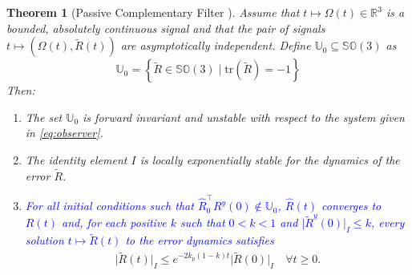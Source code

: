 \documentclass{article}
\newcommand{\SOthree}{\mathbb{SO}(3)}
\newcommand{\R}[1]{\mathbb{R}^{#1}}
\newtheorem{theorem}{Theorem}
\newcommand{\textblue}[1]{\textcolor{blue}{#1}}
\newcommand{\Rtilde}{\tilde{R}}
\newcommand{\normSOthree}[1]{{{\vert}#1 {\vert}_I}}
\newcommand{\expo}[1]{e^{#1}}
\begin{document}
\begin{theorem}[Passive Complementary Filter \textblue{{\cite[Theorem 4.2]{mahony_complementaryFilter}}}]
Assume that $t\mapsto \Omega(t)\in \R{3}$ is a bounded, absolutely continuous signal and that the pair of signals {$t\mapsto (\Omega(t), \Rtilde(t))$ are asymptotically independent}. Define $\mathbb{U}_0 \subseteq \SOthree$ as 
\[\mathbb{U}_0 = \left\{ \Rtilde\in \SOthree \mid \text{tr}(\Rtilde) = -1\right\}\]
Then:
\begin{enumerate}[label=(\alph*)]
    \item The set $\mathbb{U}_0$ is forward invariant and {unstable} with respect to the system given in \eqref{eq:observer}. \label{item:thm_mahony_bullet1}
    \item {The identity element $I$ is locally exponentially stable for the dynamics of the error $\Rtilde$.}\label{item:thm_mahony_bullet2}
    \item \textblue{For all initial conditions such that ${\hat{R}_0^\top R^y(0) \notin \mathbb{U}_0}$, $\hat{R}(t)$ converges to $R(t)$ and, for each positive $k$ such that $0 < k < 1$ and $\normSOthree{\Rtilde^y(0)} \leq k$, every solution $t\mapsto\Rtilde(t)$ to the error dynamics satisfies \label{item:thm_mahony_bullet3}}
    \begin{align}\label{eq:localExponentialStability}
        \normSOthree{\Rtilde(t)} \leq \expo{-2k_p(1-k)t}\normSOthree{\Rtilde(0)} \quad \forall t \geq 0.
    \end{align}
\end{enumerate}
\end{theorem}
\end{document}
